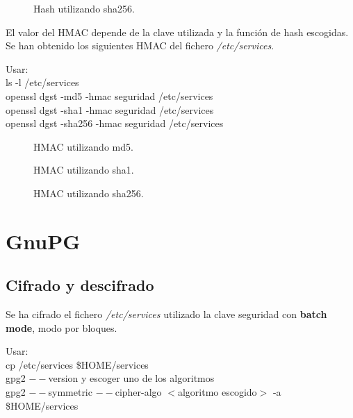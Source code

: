 \documentclass[11pt]{article}
\begin{document}
      \begin{figure}[!h]
        \centering
        \caption{Hash utilizando sha256.}
      \end{figure}

      \bigskip
      \par
      El valor del HMAC depende de la clave utilizada y la función de hash escogidas.
      Se han obtenido los siguientes HMAC del fichero \textit{/etc/services}.

      \par
      Usar:\\
      ls -l /etc/services\\
      openssl dgst -md5 -hmac seguridad /etc/services\\
      openssl dgst -sha1 -hmac seguridad /etc/services\\
      openssl dgst -sha256 -hmac seguridad /etc/services\\

      \begin{figure}[!h]
        \centering
        \caption{HMAC utilizando md5.}
      \end{figure}

      \begin{figure}[!h]
        \centering
        \caption{HMAC utilizando sha1.}
      \end{figure}

      \begin{figure}[!h]
        \centering
        \caption{HMAC utilizando sha256.}
      \end{figure}

  \section{GnuPG}
    \subsection{Cifrado y descifrado}
      \par
      Se ha cifrado el fichero \textit{/etc/services} utilizado la clave seguridad con \textbf{batch mode}, modo por bloques.

      \par
      Usar:\\
      cp /etc/services \$HOME/services\\
      gpg2 $--$version \hspace{10mm}y escoger uno de los algoritmos\\
      gpg2 $--$symmetric $--$cipher-algo $<$algoritmo escogido$>$ -a \$HOME/services
\end{document}
